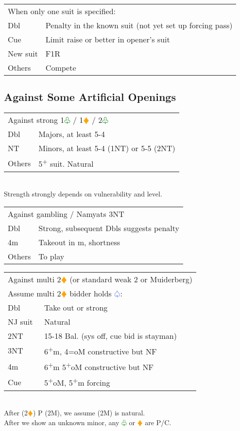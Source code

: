 \documentclass{article}
\renewcommand{\sp}{\textcolor{RoyalBlue}{$\varspade$}}
\newcommand{\di}{\textcolor{Orange}{$\vardiamond$}}
\newcommand{\cl}{\textcolor{Green}{$\varclub$}}
\newcommand{\nt}{\relsize{-1}NT\relsize{1}}
\newcommand{\up}{\textsuperscript{+}}
\begin{document}
\medskip

\begin{tabular}{|l|p{6.5cm}}
	\multicolumn{2}{l}{When only one suit is specified:} \\
    Dbl & Penalty in the known suit (not yet set up forcing pass) \\
    Cue & Limit raise or better in opener's suit \\
    New suit & F1R \\
    Others & Compete
\end{tabular}

\subsection{Against Some Artificial Openings}

\begin{tabular}{|l|p{6.5cm}}
	\multicolumn{2}{l}{Against strong 1\cl{} / 1\di{} / 2\cl{}} \\
    Dbl & Majors, at least 5-4 \\
    \nt & Minors, at least 5-4 (1\nt{}) or 5-5 (2\nt{}) \\
    Others & 5\up{} suit. Natural
\end{tabular}\\
Strength strongly depends on vulnerability and level. \\

\begin{tabular}{|l|p{6.5cm}}
	\multicolumn{2}{l}{Against gambling / Namyats 3\nt{}} \\
    Dbl & Strong, subsequent Dbls suggests penalty \\
    4m & Takeout in m, shortness \\
    Others & To play
\end{tabular}

\medskip

\begin{tabular}{|l|p{6.5cm}}
	\multicolumn{2}{l}{Against multi 2\di{} (or standard weak 2 or Muiderberg)} \\
	\multicolumn{2}{l}{Assume multi 2\di{} bidder holds \sp{}:} \\
    Dbl & Take out or strong \\
    NJ suit & Natural \\
    2\nt & 15-18 Bal. (sys off, cue bid is stayman) \\
    3\nt & 6\up{}m, 4=oM constructive but NF \\
    4m & 6\up{}m 5\up{}oM constructive but NF \\
    Cue & 5\up{}oM, 5\up{}m forcing \\
\end{tabular}\\
After (2\di{}) P (2M), we assume (2M) is natural. \\
After we show an unknown minor, any \cl{} or \di{} are P/C.
\end{document}

